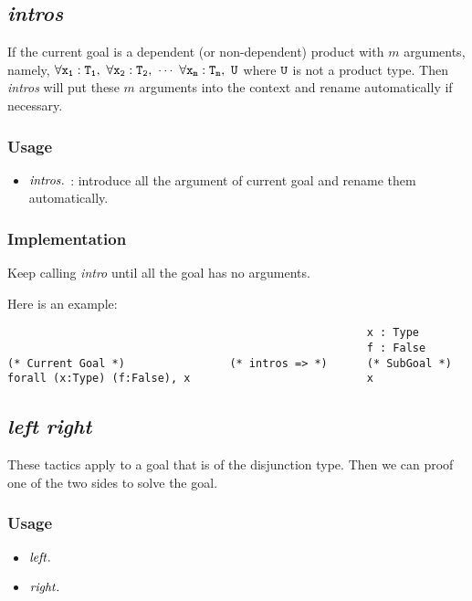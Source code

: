 \subsection{\it intros}

If the current goal is a dependent (or non-dependent) product with $m$ arguments, namely,
$\tt \forall x_1:T_1,\ \forall x_2:T_2,\ \cdots\ \forall x_m:T_m,\ U$ where $\tt U$ is not a product type.
Then \textit{intros} will put these $m$ arguments into the context and rename automatically if necessary.

\subsubsection*{Usage}
\begin{itemize}
\item ${\it intros}.$ : introduce all the argument of current goal and rename them automatically.
\end{itemize}

\subsubsection*{Implementation}
Keep calling {\it intro} until all the goal has no arguments.\par
Here is an example:
\begin{center}
\begin{minipage}{\textwidth}
\begin{verbatim}
                                                       x : Type
                                                       f : False 
(* Current Goal *)                (* intros => *)      (* SubGoal *) 
forall (x:Type) (f:False), x                           x
\end{verbatim}
\end{minipage}
\end{center}

\subsection{\it left right}
These tactics apply to a goal that is of the disjunction type. Then we can proof one of the two sides to solve the goal.

\subsubsection*{Usage}
\begin{itemize}
    \item ${\it left}.$
    \item ${\it right}.$
\end{itemize}

